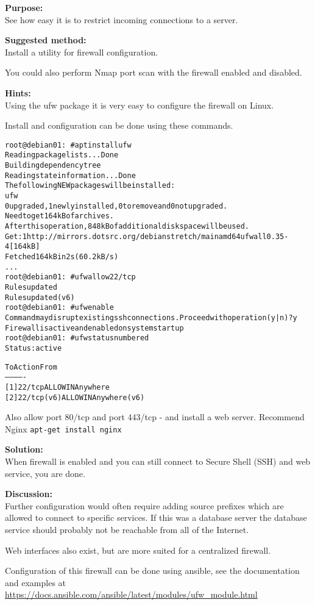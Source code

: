 \documentclass[a4paper,11pt,notitlepage]{report}
\begin{document}
{\bf Purpose:}\\
See how easy it is to restrict incoming connections to a server.


{\bf Suggested method:}\\
Install a utility for firewall configuration.

You could also perform Nmap port scan with the firewall enabled and disabled.

{\bf Hints:}\\
Using the ufw package it is very easy to configure the firewall on Linux.

Install and configuration can be done using these commands.
\begin{alltt}
root@debian01:~# apt install ufw
Reading package lists... Done
Building dependency tree
Reading state information... Done
The following NEW packages will be installed:
  ufw
0 upgraded, 1 newly installed, 0 to remove and 0 not upgraded.
Need to get 164 kB of archives.
After this operation, 848 kB of additional disk space will be used.
Get:1 http://mirrors.dotsrc.org/debian stretch/main amd64 ufw all 0.35-4 [164 kB]
Fetched 164 kB in 2s (60.2 kB/s)
...
root@debian01:~# ufw allow 22/tcp
Rules updated
Rules updated (v6)
root@debian01:~# ufw enable
Command may disrupt existing ssh connections. Proceed with operation (y|n)? y
Firewall is active and enabled on system startup
root@debian01:~# ufw status numbered
Status: active

     To                         Action      From
     --                         ------      ----
[ 1] 22/tcp                     ALLOW IN    Anywhere
[ 2] 22/tcp (v6)                ALLOW IN    Anywhere (v6)
\end{alltt}

Also allow port 80/tcp and port 443/tcp - and install a web server. Recommend Nginx \verb+apt-get install nginx+

{\bf Solution:}\\
When firewall is enabled and you can still connect to Secure Shell (SSH) and web service, you are done.

{\bf Discussion:}\\
Further configuration would often require adding source prefixes which are allowed to connect to specific services. If this was a database server the database service should probably not be reachable from all of the Internet.

Web interfaces also exist, but are more suited for a centralized firewall.

Configuration of this firewall can be done using ansible, see the documentation and examples at \url{https://docs.ansible.com/ansible/latest/modules/ufw_module.html}
\end{document}
